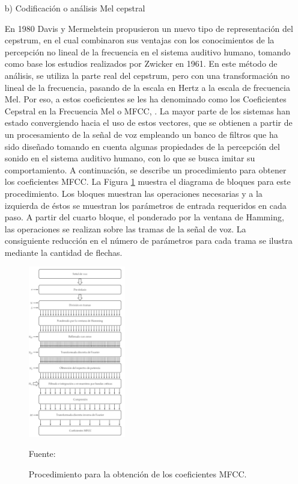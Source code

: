 \begin{enumerate}
\newpage
\item[b)]Codificación o análisis Mel cepstral
\par
En 1980 Davis y Mermelstein propusieron un nuevo tipo de representación del cepstrum, en el cual combinaron sus ventajas con los conocimientos de la percepción no lineal de la frecuencia en el sistema auditivo humano, tomando como base los estudios realizados por Zwicker en 1961. En este método de análisis, se utiliza la parte real del cepstrum, pero con una transformación no lineal de la frecuencia, pasando de la escala en Hertz a la escala de frecuencia Mel. Por eso, a estos coeficientes se les ha denominado como los Coeficientes Cepstral en la Frecuencia Mel o MFCC, \cite{eyra}.
\vskip 0.5cm
La mayor parte de los sistemas han estado convergiendo hacia el uso de estos vectores, que se obtienen a partir de un procesamiento de la señal de voz empleando un banco de filtros que ha sido diseñado tomando en cuenta algunas propiedades de la percepción del sonido en el sistema auditivo humano, con lo que se busca imitar su comportamiento.
\vskip 0.5cm
A continuación, se describe un procedimiento para obtener los coeficientes MFCC. La Figura \ref{fig:figura2.38} muestra el diagrama de bloques para este procedimiento. Los bloques muestran las operaciones necesarias y a la izquierda de éstos se muestran los parámetros de entrada requeridos en cada paso. A partir del cuarto bloque, el ponderado por la ventana de Hamming, las operaciones se realizan sobre las tramas de la señal de voz. La consiguiente reducción en el número de parámetros para cada trama se ilustra mediante la cantidad de flechas.

\newpage
\begin{figure}[ht]
\begin{center}
\includegraphics[width=0.4\textwidth]{Imagenes/Cap2/image039}
\end{center}
\begin{center}
\vskip -0.5cm
\caption{\small{Procedimiento para la obtención de los coeficientes MFCC.}}
\label{fig:figura2.38}
{\small{Fuente: \cite{eyra}}}
\end{center}
\end{figure}


\end{enumerate}
